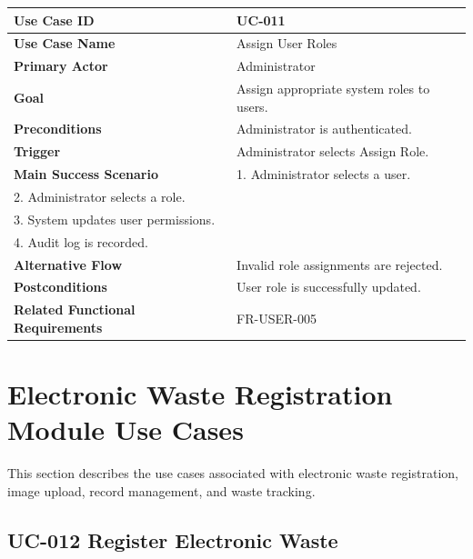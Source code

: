 \begin{longtable}{|p{4cm}|p{10cm}|}

\hline
\textbf{Use Case ID} &
UC-011 \\
\hline

\textbf{Use Case Name} &
Assign User Roles \\
\hline

\textbf{Primary Actor} &
Administrator \\
\hline

\textbf{Goal} &
Assign appropriate system roles to users. \\
\hline

\textbf{Preconditions} &
Administrator is authenticated. \\
\hline

\textbf{Trigger} &
Administrator selects Assign Role. \\
\hline

\textbf{Main Success Scenario} &
1. Administrator selects a user.\\
2. Administrator selects a role.\\
3. System updates user permissions.\\
4. Audit log is recorded.\\
\hline

\textbf{Alternative Flow} &
Invalid role assignments are rejected.\\
\hline

\textbf{Postconditions} &
User role is successfully updated.\\
\hline

\textbf{Related Functional Requirements} &
FR-USER-005 \\
\hline

\end{longtable}

\section{Electronic Waste Registration Module Use Cases}
\label{sec:ewaste-usecases}

This section describes the use cases associated with electronic waste
registration, image upload, record management, and waste tracking.

\subsection{UC-012 Register Electronic Waste}

